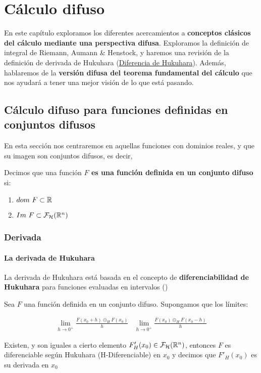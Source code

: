 \chapter{Cálculo difuso}
En este capítulo exploramos los diferentes acercamientos a \textbf{conceptos clásicos del cálculo mediante una perspectiva difusa}. Exploramos la definición de integral de Riemann, Aumann \& Henstock, y haremos una revisión de la definición de derivada de Hukuhara (\hyperref[def:hukukara]{Diferencia de Hukuhara}). Además, hablaremos de la \textbf{versión difusa del teorema fundamental del cálculo} que nos ayudará a tener una mejor visión de lo que está pasando.

\section{Cálculo difuso para funciones definidas en conjuntos difusos}
En esta sección nos centraremos en aquellas funciones con dominios reales, y que su imagen son conjuntos difusos, es decir,

\begin{definicion}
	\label{def:fizzusetvaluedfunc} Decimos que una función \textbf{$F$ es una función definida en un conjunto difuso} si:
	\begin{enumerate}
		\item $dom ~ F \subset \mathbb R$
		\item $Im ~ F \subset \mathcal{F}_\mathcal{H}(\mathbb R^n)$
	\end{enumerate}
\end{definicion}

\subsection{Derivada}

\subsubsection{La derivada de Hukuhara}
La derivada de Hukuhara está basada en el concepto de \textbf{diferenciabilidad de Hukuhara} para funciones evaluadas en intervalos (\cite{derivatehukuhara})

\begin{definicion}
	Sea $F$ una función definida en un conjunto difuso. Supongamos que los límites:
	
	\[
		\begin{array}{c||c}
			\lim\limits_{h \rightarrow 0^+} \frac{F(x_0 + h) \circleddash_H F(x_0)}{h} & \lim\limits_{h \rightarrow 0^+} \frac{F(x_0) \circleddash_H F(x_0 - h)}{h}
		\end{array}
	\]
	
	Existen, y son iguales a cierto elemento $F'_H(x_0) \in \mathcal{F}_\mathcal{H}(\mathbb R^n)$, entonces $F$ es diferenciable según Hukuhara (H-Diferenciable) en $x_0$ y decimos que $F'_H(x_0)$ es su derivada en $x_0$ 
\end{definicion}

